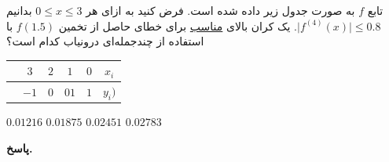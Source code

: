 تابع
\(f\)
به صورت جدول زیر داده شده است. فرض کنید به ازای هر 
\(0\leq x\leq 3\)
بدانیم
\(\mid f^{(4)}(x) \mid \leq 0.8\).
یک کران بالای \underline{مناسب} برای خطای حاصل از تخمین 
\(f(1.5)\) با استفاده از چندجمله‌ای درونیاب کدام است؟
\hspace*{3cm}
	\begin{tabular}{ccccc|c}
		& \(3\) &\(2\)&\(1\) & \(0\) & \(x_i\)\\
		\hline
		& \(-1\) & \(0\) & \(01\) &\( 1\) & \(y_i)\)
	\end{tabular}
\vspace*{-.3cm}
 \mulchoice
	{\(0.01216\)}
	{\(0.01875\)}
	{\(0.02451\)}
	{\(0.02783\)}

\begin{answer}

	\textbf{پاسخ.}
	
\end{answer}
